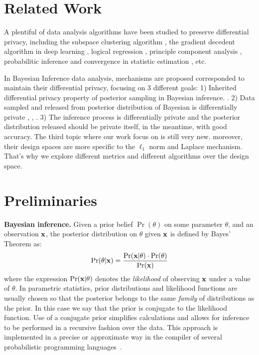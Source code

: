 \documentclass{article}
\begin{document}
\section{Related Work}

A plentiful of data analysis algorithms have been studied to preserve differential privacy, including the subspace clustering algorithm \cite{wang2015differentially}, the gradient decedent algorithm in deep learning \cite{abadi2016deep}, logical regression \cite{chaudhuri2009privacy}, principle component analysis \cite{chaudhuri2012near}, probabilitic inference \cite{williams2010probabilistic} and convergence in statistic estimation \cite{chaudhuri2012convergence}, etc. 

In Bayesian Inference data analysis, mechanisms are proposed corresponded to maintain their differential privacy, focusing on 3 different goals: 1) Inherited differential privacy property of posterior sampling in Bayesian inference. \cite{dimitrakakis2014robust,zhang2016differential,zheng2015differential,wang2015privacy}. 2) Data sampled and released from posterior distribution of Bayesian is differentially private \cite{Zhang2017privbayes}, \cite{dimitrakakis2015differential},  \cite{foulds2016theory}. 3) The inference process is differentially private and the posterior distribution released should be private itself, in the meantime, with good accuracy. The third topic where our work focus on is still very new. moreover, their design spaces are more specific to the $\ell_1$ norm and Laplace mechanism. That's why we explore different metrics and different algorithms over the design space.


\section{Preliminaries}
\label{sec_background}
\noindent \textbf{Bayesian inference.} 
Given a prior belief $\Pr(\theta)$ on some parameter $\theta$,
and an observation $\textbf{x}$, the posterior distribution on $\theta$
given $\textbf{x}$ is defined by Bayes' Theorem as:
\[
  \Pr(\theta | \textbf{x}) = \frac{\Pr(\textbf{x} | \theta) \cdot \Pr(\theta)}{\Pr(\textbf{x})}
\]
where the expression $\Pr(\textbf{x} | \theta)$ denotes the
\emph{likelihood} of observing $\textbf{x}$ under a value of
$\theta$. 
In parametric statistics, prior distributions and likelihood functions are usually chosen so that the posterior
belongs to the same \emph{family} of distributions as the prior. In this case we say that the prior
is conjugate to the likelihood function. Use of a conjugate prior
simplifies calculations and allows for inference to be performed in a
recursive fashion over the data. This approach is implemented in a
precise or approximate way in the compiler of several
probabilistic programming languages~\cite{}.
\end{document}

